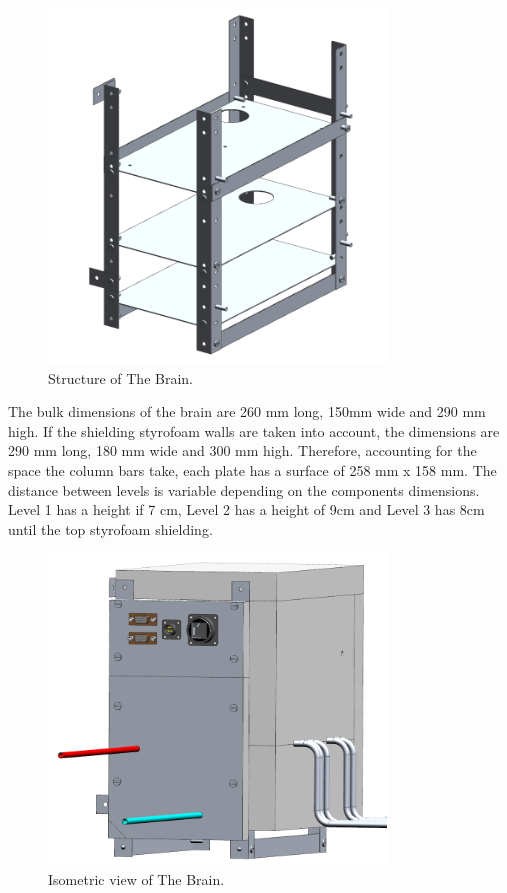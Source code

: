 \begin{figure}[H]
    \centering
    \includegraphics[width=0.8\textwidth]{4-experiment-design/img/Mechanical/Brain_Structure.png}
    \caption{Structure of The Brain.}
    \label{brain_structure}
\end{figure}

\smallskip
The bulk dimensions of the brain are 260 mm long, 150mm wide and 290 mm high. If the shielding styrofoam walls are taken into account, the dimensions are 290 mm long, 180 mm wide and 300 mm high.
Therefore, accounting for the space the column bars take, each plate has a surface of 258 mm x 158 mm. The distance between levels is variable depending on the components dimensions. Level 1 has a height if 7 cm, Level 2 has a height of 9cm and Level 3 has 8cm until the top styrofoam shielding.

\begin{figure}[H]
    \centering
    \includegraphics[width=0.8\textwidth]{4-experiment-design/img/Mechanical/Brain_Isometric.png}
    \caption{Isometric view of The Brain.}
    \label{brain_isometric}
\end{figure}

